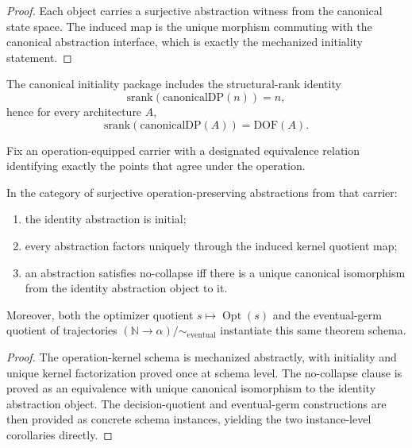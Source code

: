 \begin{proof}
Each object carries a surjective abstraction witness from the canonical state space. The induced map is the unique morphism commuting with the canonical abstraction interface, which is exactly the mechanized initiality statement.
\end{proof}

\begin{corollary}\label{thm:canonical-initiality-srank}
The canonical initiality package includes the structural-rank identity
\[
\mathrm{srank}(\mathrm{canonicalDP}(n))=n,
\]
hence for every architecture $A$,
\[
\mathrm{srank}(\mathrm{canonicalDP}(A))=\mathrm{DOF}(A).
\]
\end{corollary}

\begin{theorem}\label{thm:kernel-quotient-universality-canonicity}
Fix an operation-equipped carrier with a designated equivalence relation identifying exactly the points that agree under the operation.

In the category of surjective operation-preserving abstractions from that carrier:
\begin{enumerate}
\item the identity abstraction is initial;
\item every abstraction factors uniquely through the induced kernel quotient map;
\item an abstraction satisfies no-collapse iff there is a unique canonical isomorphism from the identity abstraction object to it.
\end{enumerate}

Moreover, both the optimizer quotient $s\mapsto \operatorname{Opt}(s)$ and the eventual-germ quotient of trajectories $(\mathbb{N}\to\alpha)/\sim_{\mathrm{eventual}}$ instantiate this same theorem schema.
\end{theorem}

\begin{proof}
The operation-kernel schema is mechanized abstractly, with initiality and unique kernel factorization proved once at schema level. The no-collapse clause is proved as an equivalence with unique canonical isomorphism to the identity abstraction object. The decision-quotient and eventual-germ constructions are then provided as concrete schema instances, yielding the two instance-level corollaries directly.
\end{proof}

